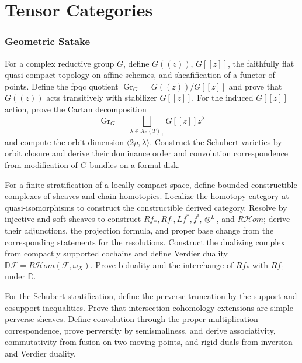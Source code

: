 \part{Tensor Categories}

\section{Geometric Satake}

\begin{exercise}
For a complex reductive group $G$, define
$G((z))$, $G[[z]]$, the faithfully flat quasi-compact topology on affine
schemes, and sheafification of a functor of points.  Define the fpqc quotient
$\operatorname{Gr}_G=G((z))/G[[z]]$ and prove that $G((z))$ acts transitively
with stabilizer $G[[z]]$.  For the induced $G[[z]]$ action, prove the Cartan
decomposition
\[
 \operatorname{Gr}_G=\bigsqcup_{\lambda\in X_*(T)_+}
 G[[z]]z^\lambda
\]
and compute the orbit dimension $\langle2\rho,\lambda\rangle$.  Construct
the Schubert varieties by orbit closure and derive their dominance order and
convolution correspondence from modification of $G$-bundles on a formal disk.
\end{exercise}

\begin{exercise}
For a finite stratification of a locally compact space, define bounded
constructible complexes of sheaves and chain homotopies.  Localize the
homotopy category at quasi-isomorphisms to construct the constructible derived
category.  Resolve by injective and soft sheaves to construct
$Rf_*,Rf_!,Lf^*,f^!,\otimes^L$, and $R\mathcal Hom$; derive their adjunctions,
the projection formula, and proper base change from the corresponding
statements for the resolutions.  Construct the dualizing complex from compactly
supported cochains and define Verdier duality
$\mathbb D\mathcal F=R\mathcal Hom(\mathcal F,\omega_X)$.  Prove biduality and
the interchange of $Rf_*$ with $Rf_!$ under $\mathbb D$.
\end{exercise}

\begin{exercise}
For the Schubert stratification, define the perverse truncation by the support
and cosupport inequalities.  Prove that intersection cohomology
extensions are simple perverse sheaves.  Define convolution through the
proper multiplication correspondence, prove perversity by semismallness, and
derive associativity, commutativity from fusion on two moving points, and
rigid duals from inversion and Verdier duality.
\end{exercise}

